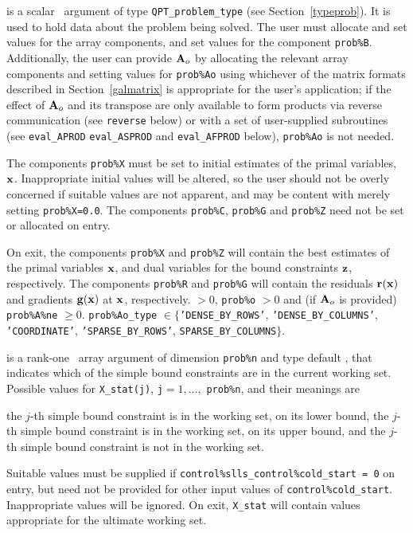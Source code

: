 \documentclass{galahad}
\begin{document}
\vspace*{-3mm}
\begin{description}
 is a scalar \intentinout\ argument of type
{\tt QPT\_problem\_type}
(see Section~\ref{typeprob}).
It is used to hold data about the problem being solved.
The user must allocate and set values for the array components,
and set values for the component {\tt prob\%B}.
Additionally, the user can provide ${\mathbf{A}}_o$ by allocating the
relevant array components and setting values for {\tt prob\%Ao}
using whichever
of the matrix formats described in Section~\ref{galmatrix}
is appropriate for the user's application;
if the effect of ${\mathbf{A}}_o$ and its transpose are only available to form products
via reverse communication (see {\tt reverse} below)
or with a set of user-supplied subroutines (see {\tt eval\_APROD}
{\tt eval\_ASPROD} and {\tt eval\_AFPROD} below), {\tt prob\%Ao} is not needed.

The components {\tt prob\%X}
must be set to initial estimates of the primal variables, ${\mathbf{x}}$.
Inappropriate initial values will be altered, so the user should
not be overly concerned if suitable values are not apparent, and may be
content with merely setting {\tt prob\%X=0.0}.
The components {\tt prob\%C}, {\tt prob\%G} and {\tt prob\%Z}
need not be set or allocated on entry.

On exit, the components {\tt prob\%X} and {\tt prob\%Z}
will contain the best estimates of the primal variables ${\mathbf{x}}$,
and dual variables for the bound constraints ${\mathbf{z}}$, respectively.
The components {\tt prob\%R} and {\tt prob\%G}
will contain the residuals ${\mathbf{r}}({\mathbf{x}})$
and gradients ${\mathbf{g}}({\mathbf{x}})$ at ${\mathbf{x}}$, respectively.
 $> 0$, {\tt prob\%o} $> 0$
              and (if ${\mathbf{A}}_o$ is provided) {\tt prob\%A\%ne} $\geq 0$.
              {\tt prob\%Ao\_type} $\in 
               \{${\tt 'DENSE\_BY\_ROWS'}, {\tt 'DENSE\_BY\_COLUMNS'},
                  {\tt 'COORDINATE'}, {\tt 'SPARSE\_BY\_\-ROWS'}, 
                  {\tt SPARSE\_BY\_COLUMNS}$\}$.

 is a rank-one \intentinout\ array argument of dimension {\tt prob\%n}
and type default \integer, that indicates which of the simple bound
constraints are in the current working set. Possible values for
{\tt X\_stat(j)}, {\tt j}$=1, \ldots ,$ {\tt prob\%n}, and their meanings are
\begin{description}
 the $j$-th simple bound constraint
is in the working set, on its lower bound,
 the $j$-th simple bound constraint
is in the working set, on its upper bound, and
  the $j$-th simple bound constraint is not in the working set.
\end{description}
Suitable values must be supplied if
{\tt control\%slls\_control\%cold\_start = 0} on entry,
but need not be provided for other input values of {\tt control\%cold\_start}.
Inappropriate values will be ignored.
On exit, {\tt X\_stat} will contain values appropriate for the ultimate
working set.


\end{description}
\end{document}

